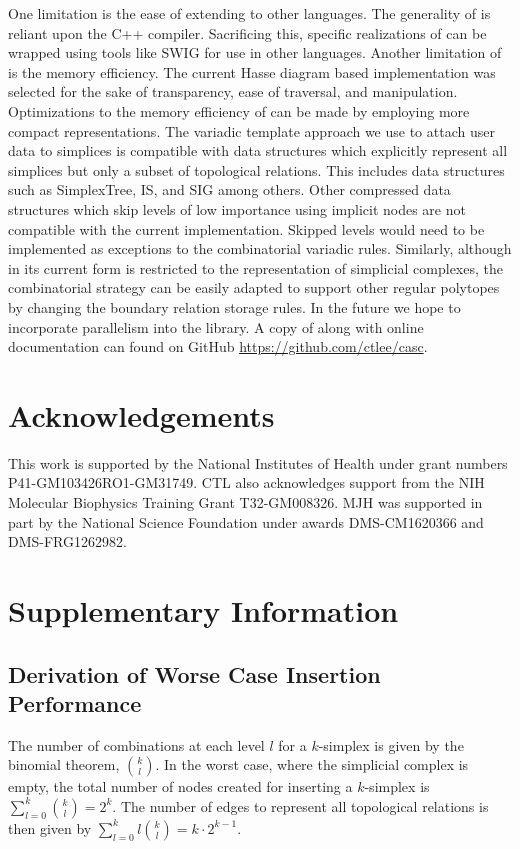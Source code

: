 \par One limitation is the ease of extending to other languages.
The generality of \asc is reliant upon the C++ compiler.
Sacrificing this, specific realizations of \asc can be wrapped using tools like SWIG for use in other languages.
Another limitation of \asc is the memory efficiency.
The current Hasse diagram based implementation was selected for the sake of transparency, ease of traversal, and manipulation.
Optimizations to the memory efficiency of \asc can be made by employing more compact representations.
The variadic template approach we use to attach user data to simplices is compatible with data structures which explicitly represent all simplices but only a subset of topological relations.
This includes data structures such as SimplexTree\cite{Boissonnat2012}, IS\cite{DeFloriani2010b}, and SIG\cite{DeFloriani2004} among others.
Other compressed data structures which skip levels of low importance using implicit nodes are not compatible with the current \asc implementation.
Skipped levels would need to be implemented as exceptions to the combinatorial variadic rules.
Similarly, although \asc in its current form is restricted to the representation of simplicial complexes, the combinatorial strategy can be easily adapted to support other regular polytopes by changing the boundary relation storage rules.
In the future we hope to incorporate parallelism into the \asc library.
A copy of \asc along with online documentation can found on GitHub \url{https://github.com/ctlee/casc}.

\section{Acknowledgements}
This work is supported by the National Institutes of Health under grant numbers P41-GM103426RO1-GM31749.
CTL also acknowledges support from the NIH Molecular Biophysics Training Grant T32-GM008326.
MJH was supported in part by the National Science Foundation under awards DMS-CM1620366 and DMS-FRG1262982.

\section{Supplementary Information}
\subsection{Derivation of Worse Case Insertion Performance}
\par The number of combinations at each level $l$ for a $k$-simplex is given by the binomial theorem, $\binom{k}{l}$.
In the worst case, where the simplicial complex is empty, the total number of nodes created for inserting a $k$-simplex is $\sum_{l=0}^{k}\binom{k}{l} = 2^k$.
The number of edges to represent all topological relations is then given by $\sum_{l=0}^{k}l\binom{k}{l} = k\cdot 2^{k-1}$.

